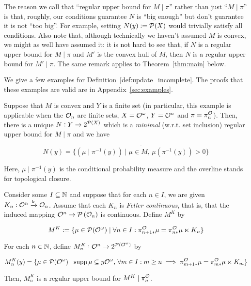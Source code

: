 The reason we call that \enquote{regular upper bound for $M\mid\pi$} rather than just \enquote{$M\mid\pi$} is that, roughly, our conditions guarantee $N$ is \enquote{big enough} but don't guarantee it is not \enquote{too big}. For example, setting $N(y):=\mathcal{P}(X)$ would trivially satisfy all conditions. Also note that, although technically we haven't assumed $M$ is convex, we might as well have assumed it: it is not hard to see that, if $N$ is a regular upper bound for $M \mid \pi$ and $M'$ is the convex hull of $M$, then $N$ is a regular upper bound for $M' \mid \pi$. The same remark applies to Theorem~\ref{thm:main} below.

We give a few examples for Definition~\ref{def:update_incomplete}. The proofs that these examples are valid are in Appendix~\ref{sec:examples}.

\begin{samepage}
\begin{example}
\label{exm:update_incomplete_finite}

Suppose that $M$ is convex and $Y$ is a finite set (in particular, this example is applicable when the $\mathcal{O}_n$ are finite sets, $X=\mathcal{O}^\omega$, $Y=\mathcal{O}^n$ and $\pi=\pi^{\mathcal{O}}_n$). Then, there is a unique $N: Y \rightarrow 2^{\mathcal{P}(X)}$ which is a \emph{minimal} (w.r.t. set inclusion) regular upper bound for $M \mid \pi$ and we have

\begin{equation}
\label{eqn:exm__update_incomplete_finite}
N(y) = \overline{\{\left(\mu \mid \pi^{-1}(y)\right) \mid \mu \in M,\, \mu\left(\pi^{-1}(y)\right) > 0\}}
\end{equation}

Here, $\mu \mid \pi^{-1}(y)$ is the conditional probability measure and the overline stands for topological closure.

\end{example}
\end{samepage}
%
\begin{samepage}
\begin{example}
\label{exm:update_incomplete_kernels}

Consider some $I \subseteq \mathbb{N}$ and suppose that for each $n \in I$, we are given $K_n: \mathcal{O}^n \xrightarrow{\textnormal{k}} \mathcal{O}_n$. Assume that each $K_n$ is \emph{Feller continuous}, that is, that the induced mapping $\mathcal{O}^n \rightarrow \mathcal{P}\left(\mathcal{O}_n\right)$ is continuous. Define $M^K$ by

\begin{equation}
M^K:=\{\mu \in \mathcal{P}(\mathcal{O}^\omega) \mid \forall n \in I: \pi^{\mathcal{O}}_{n+1*}\mu = \pi^{\mathcal{O}}_{n*}\mu \ltimes K_n\}
\end{equation}

For each $n \in \mathbb{N}$, define $M^K_n: \mathcal{O}^n \rightarrow 2^{\mathcal{P}(\mathcal{O}^\omega)}$ by

\begin{equation}
M^K_n(y) = \{\mu \in \mathcal{P}(\mathcal{O}^\omega) \mid \operatorname{supp}{\mu} \subseteq y\mathcal{O}^\omega,\, \forall m \in I: m \geq n \implies \pi^{\mathcal{O}}_{m+1*}\mu = \pi^{\mathcal{O}}_{m*}\mu \ltimes K_m\}
\end{equation}

Then, $M^K_n$ is a regular upper bound for $M^K \mid \pi^{\mathcal{O}}_n$.

\end{example}
\end{samepage}

